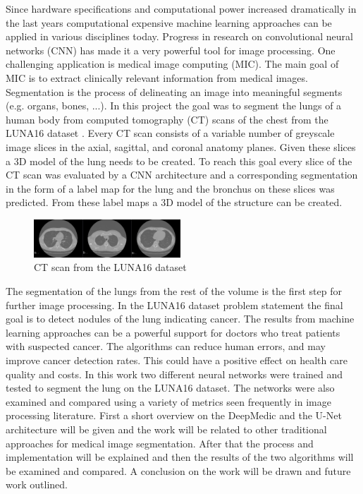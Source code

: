
Since hardware specifications and computational power increased dramatically in the last years computational expensive machine learning approaches can be applied in various disciplines today. Progress in research on convolutional neural networks (CNN) has made it a very powerful tool for image processing.\newline
One challenging application is medical image computing (MIC). The main goal of MIC is to extract clinically relevant information from medical images. Segmentation is the process of delineating an image into meaningful segments (e.g. organs, bones, ...).\newline
In this project the goal was to segment the lungs of a human body from computed tomography (CT) scans of the chest from the LUNA16 dataset \cite{luna}. Every CT scan consists of a variable number of greyscale image slices in the axial, sagittal, and coronal anatomy planes. Given these slices a 3D model of the lung needs to be created. To reach this goal every slice of the CT scan was evaluated by a CNN architecture and a corresponding segmentation in the form of a label map for the lung and the bronchus on these slices was predicted. From these label maps a 3D model of the structure can be created. \newline

\begin{figure}[h!]
	\includegraphics[width=0.49\textwidth, angle=0]{files/ctscans.jpg}
	\caption{CT scan from the LUNA16 dataset}
	\label{scan_picture}
\end{figure}

The segmentation of the lungs from the rest of the volume is the first step for further image processing. In the LUNA16 dataset problem statement the final goal is to detect nodules of the lung indicating cancer. The results from machine learning approaches can be a powerful support for doctors who treat patients with suspected cancer. The algorithms can reduce human errors, and may improve cancer detection rates. This could have a positive effect on health care quality and costs.\newline
In this work two different neural networks were trained and tested to segment the lung on the LUNA16 dataset. The networks were also examined and compared using a variety of metrics seen frequently in image processing literature.\newline
First a short overview on the DeepMedic and the U-Net architecture will be given and the work will be related to other traditional approaches for medical image segmentation. After that the process and implementation will be explained and then the results of the two algorithms will be examined and compared. A conclusion on the work will be drawn and future work outlined.
